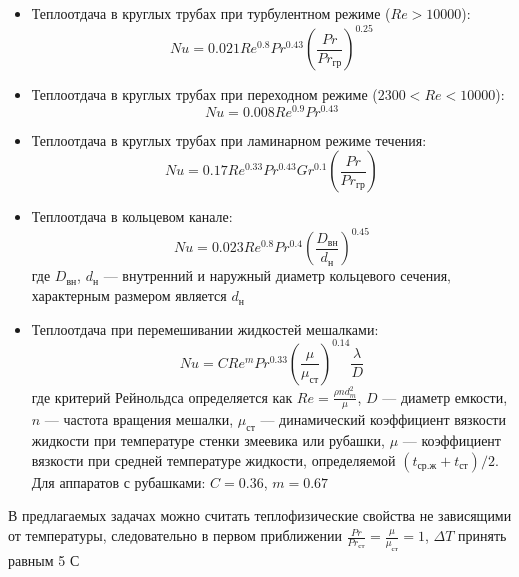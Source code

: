  \begin{itemize}
	 \item Теплоотдача в круглых трубах при турбулентном режиме ($Re>10000$):
		 \begin{equation}
		 	Nu=0.021 Re^{0.8} Pr^{0.43} \left( \dfrac{Pr}{Pr_{гр}} \right) ^{0.25} 
		 \end{equation}
	 \item Теплоотдача в круглых трубах при переходном режиме ($2300<Re<10000$):
		 \begin{equation}
		 	Nu=0.008 Re^{0.9} Pr^{0.43}
		 \end{equation}
	 \item Теплоотдача в круглых трубах при ламинарном режиме течения:
		\begin{equation}
			Nu=0.17 Re^{0.33} Pr^{0.43} Gr^{0.1} \left( \dfrac{Pr}{Pr_{гр}} \right)
		\end{equation}
	 \item  Теплоотдача в кольцевом канале:
		 \begin{equation}
			  Nu=0.023 Re^{0.8} Pr^{0.4} \left(\dfrac{D_{вн}}{d_{н}}\right)^{0.45}
		 \end{equation}
		 где $D_{вн}$, $d_н$ --- внутренний и наружный  диаметр кольцевого сечения, характерным размером является $d_н$
	 \item Теплоотдача при перемешивании жидкостей мешалками:
	 \begin{equation}
		Nu=C Re^m Pr^{0.33} \left(\dfrac{\mu}{\mu_{ст}}\right)^{0.14} \dfrac{\lambda}{D}
	 \end{equation}
	 где критерий Рейнольдса определяется как $Re=\frac{ \rho n d_m^2}{\mu}$, $D$ --- диаметр емкости, $n$ --- частота вращения мешалки, $\mu_{ст}$ --- динамический коэффициент вязкости жидкости при температуре стенки змеевика или рубашки, $\mu$ --- коэффициент вязкости при средней температуре жидкости, определяемой $(t_{ср.ж}+t_{ст})/2$. Для аппаратов с рубашками: $C=0.36$, $m=0.67$
\end{itemize}

В предлагаемых задачах можно считать теплофизические свойства не зависящими от температуры, следовательно в первом приближении  $\frac{Pr}{Pr_{ст}}=\frac{\mu}{\mu_{ст}}=1$, $\Delta T$ принять равным 5 С
